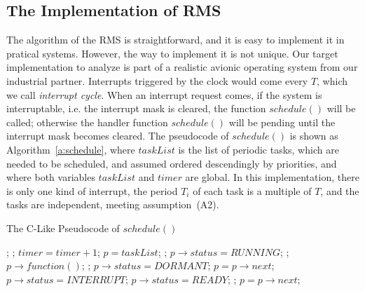 \documentclass{llncs}
\begin{document}
\subsection{The Implementation of RMS}
The algorithm of the RMS is straightforward, and it is easy to
implement it in pratical systems. However, the way to implement it is
not unique. Our target implementation to analyze is part of a
realistic avionic operating system from our industrial
partner. Interrupts triggered by the clock would come every $T$, which
we call \emph{interrupt cycle}. When an interrupt request comes, if
the system is interruptable, i.e. the interrupt mask is cleared, the
function $schedule()$ will be called; otherwise the handler function
$schedule()$ will be pending until the interrupt mask becomes cleared.
The pseudocode of $schedule()$ is shown as Algorithm~\ref{a:schedule},
where $taskList$ is the list of periodic tasks, which are needed to be
scheduled, and assumed ordered descendingly by priorities, and where
both variables $taskList$ and $timer$ are global. In this
implementation, there is only one kind of interrupt, the period $T_i$
of each task is a multiple of $T$, and the tasks are independent,
meeting assumption~(A2).

\begin{algorithm}
  \caption{The C-Like Pseudocode of $schedule()$}
  \label{a:schedule}
  \begin{algorithmic}[1]
  \State {}; 
  \State {}; \label{l:updatestatus}
  \State $timer = timer + 1$; \label{l:timer} \label{l:inc}
  \State $p = taskList$;
   \label{l:startrun1st}
      \State \Return;
      \State $p\rightarrow status = \textit{RUNNING}$;
      \State {};  \label{l:endrun1st}
      \State $p\rightarrow function()$;  \label{l:function}
      \State {};
      \State $p\rightarrow status = \textit{DORMANT}$;
    \EndIf
    \State $p = p\rightarrow next$;
  \EndWhile
\EndFunction
{}
     \label{l:startupdate}
      \State $p\rightarrow status = \textit{INTERRUPT}$;
    \EndIf
     
        \State $p\rightarrow status = \textit{READY}$;
      \Else {}
	\State {}; 
      \EndIf
    \EndIf \label{l:endupdate}
    \State $p = p\rightarrow next$;
  \EndWhile
\EndFunction
  \end{algorithmic}
\end{algorithm}
\end{document}
